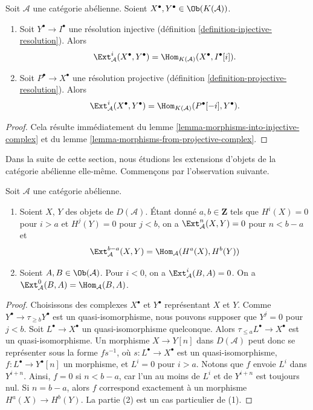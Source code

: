 \begin{lemma}
\label{lemma-compute-ext-resolutions}
Soit $\mathcal{A}$ une catégorie abélienne.
Soient $X^\bullet, Y^\bullet \in \Ob(K(\mathcal{A}))$.
\begin{enumerate}
\item Soit $Y^\bullet \to I^\bullet$ une résolution injective
(définition \ref{definition-injective-resolution}). Alors
$$
\Ext^i_\mathcal{A}(X^\bullet, Y^\bullet) =
\Hom_{K(\mathcal{A})}(X^\bullet, I^\bullet[i]).
$$
\item Soit $P^\bullet \to X^\bullet$ une résolution projective
(définition \ref{definition-projective-resolution}). Alors
$$
\Ext^i_\mathcal{A}(X^\bullet, Y^\bullet) =
\Hom_{K(\mathcal{A})}(P^\bullet[-i], Y^\bullet).
$$
\end{enumerate}
\end{lemma}

\begin{proof}
Cela résulte immédiatement du
lemme \ref{lemma-morphisms-into-injective-complex} et du
lemme \ref{lemma-morphisms-from-projective-complex}.
\end{proof}

\noindent
Dans la suite de cette section, nous étudions les extensions d'objets de la
catégorie abélienne elle-même. Commençons par l'observation suivante.

\begin{lemma}
\label{lemma-negative-exts}
Soit $\mathcal{A}$ une catégorie abélienne.
\begin{enumerate}
\item Soient $X$, $Y$ des objets de $D(\mathcal{A})$. Étant donné
$a, b \in \mathbf{Z}$ tels que $H^i(X) = 0$ pour $i > a$ et
$H^j(Y) = 0$ pour $j < b$, on a
$\Ext^n_\mathcal{A}(X, Y) = 0$ pour $n < b - a$ et
$$
\Ext^{b - a}_\mathcal{A}(X, Y) = \Hom_\mathcal{A}(H^a(X), H^b(Y))
$$
\item Soient $A, B \in \Ob(\mathcal{A})$.
Pour $i < 0$, on a $\Ext^i_\mathcal{A}(B, A) = 0$.
On a $\Ext^0_\mathcal{A}(B, A) = \Hom_\mathcal{A}(B, A)$.
\end{enumerate}
\end{lemma}

\begin{proof}
Choisissons des complexes $X^\bullet$ et $Y^\bullet$ représentant $X$ et $Y$.
Comme $Y^\bullet \to \tau_{\geq b}Y^\bullet$ est un quasi-isomorphisme, nous
pouvons supposer que $Y^j = 0$ pour $j < b$.
Soit $L^\bullet \to X^\bullet$ un quasi-isomorphisme quelconque.
Alors $\tau_{\leq a}L^\bullet \to X^\bullet$ est un quasi-isomorphisme.
Un morphisme $X \to Y[n]$ dans $D(\mathcal{A})$ peut donc se représenter sous
la forme $fs^{-1}$, où $s : L^\bullet \to X^\bullet$ est un
quasi-isomorphisme, $f : L^\bullet \to Y^\bullet[n]$ un morphisme, et
$L^i = 0$ pour $i > a$. Notons que $f$ envoie $L^i$ dans $Y^{i + n}$.
Ainsi, $f = 0$ si $n < b - a$, car l'un au moins de $L^i$ et de
$Y^{i + n}$ est toujours nul. Si $n = b - a$, alors $f$ correspond exactement
à un morphisme $H^a(X) \to H^b(Y)$. La partie (2) est un cas particulier de
(1).
\end{proof}

